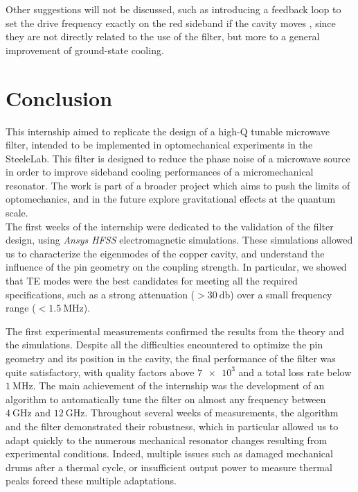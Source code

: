 \documentclass[11pt,a4pape,longbibliography]{article}
\begin{document}
Other suggestions will not be discussed, such as introducing a feedback loop to set the drive frequency exactly on the red sideband if the cavity moves \cite{rossi_enhancing_2017}, since they are not directly related to the use of the filter, but more to a general improvement of ground-state cooling.


\section{Conclusion}

This internship aimed to replicate the design of a high-Q tunable microwave filter, intended to be implemented in optomechanical experiments in the SteeleLab. This filter is designed to reduce the phase noise of a microwave source in order to improve sideband cooling performances of a micromechanical resonator. The work is part of a broader project which aims to push the limits of optomechanics, and in the future explore gravitational effects at the quantum scale.\\

The first weeks of the internship were dedicated to the validation of the filter design, using \textit{Ansys HFSS} electromagnetic simulations. These simulations allowed us to characterize the eigenmodes of the copper cavity, and understand the influence of the pin geometry on the coupling strength. In particular, we showed that TE modes were the best candidates for meeting all the required specifications, such as a strong attenuation ($>\SI{30}{\decibel}$) over a small frequency range ($<\SI{1.5}{\MHz}$).

The first experimental measurements confirmed the results from the theory and the simulations. Despite all the difficulties encountered to optimize the pin geometry and its position in the cavity, the final performance of the filter was quite satisfactory, with quality factors above $\num{7e3}$ and a total loss rate below $\SI{1}{\MHz}$. The main achievement of the internship was the development of an algorithm to automatically tune the filter on almost any frequency between $\SI{4}{\GHz}$ and $\SI{12}{\GHz}$. Throughout several weeks of measurements, the algorithm and the filter demonstrated their robustness, which in particular allowed us to adapt quickly to the numerous mechanical resonator changes resulting from experimental conditions. Indeed, multiple issues such as damaged mechanical drums after a thermal cycle, or insufficient output power to measure thermal peaks forced these multiple adaptations.\\
\end{document}
